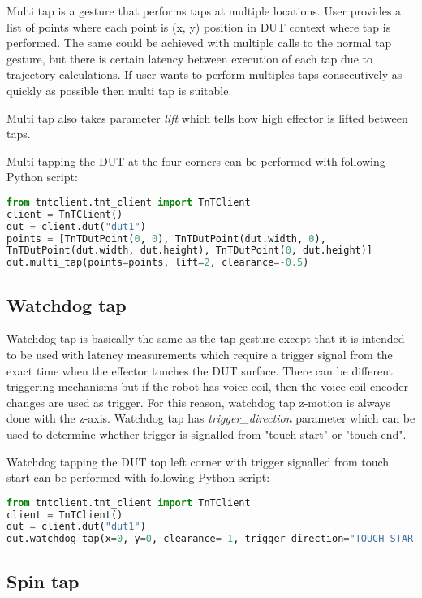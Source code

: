 Multi tap is a gesture that performs taps at multiple locations. User provides a list of points where each point is (x, y) position in DUT context where tap is performed. The same could be achieved with multiple calls to the normal tap gesture, but there is certain latency between execution of each tap due to trajectory calculations. If user wants to perform multiples taps consecutively as quickly as possible then multi tap is suitable.

Multi tap also takes parameter \emph{lift} which tells how high effector is lifted between taps.

Multi tapping the DUT at the four corners can be performed with following Python script:

\begin{lstlisting}[language=Python]
from tntclient.tnt_client import TnTClient
client = TnTClient()
dut = client.dut("dut1")
points = [TnTDutPoint(0, 0), TnTDutPoint(dut.width, 0), 
TnTDutPoint(dut.width, dut.height), TnTDutPoint(0, dut.height)]
dut.multi_tap(points=points, lift=2, clearance=-0.5)
\end{lstlisting}

\subsection{Watchdog tap}

Watchdog tap is basically the same as the tap gesture except that it is intended to be used with latency measurements which require a trigger signal from the exact time when the effector touches the DUT surface. There can be different triggering mechanisms but if the robot has voice coil, then the voice coil encoder changes are used as trigger. For this reason, watchdog tap z-motion is always done with the z-axis. Watchdog tap has \emph{trigger\_direction} parameter which can be used to determine whether trigger is signalled from "touch start" or "touch end".

Watchdog tapping the DUT top left corner with trigger signalled from touch start can be  performed with following Python script:

\begin{lstlisting}[language=Python]
from tntclient.tnt_client import TnTClient
client = TnTClient()
dut = client.dut("dut1")
dut.watchdog_tap(x=0, y=0, clearance=-1, trigger_direction="TOUCH_START")
\end{lstlisting}

\subsection{Spin tap}


